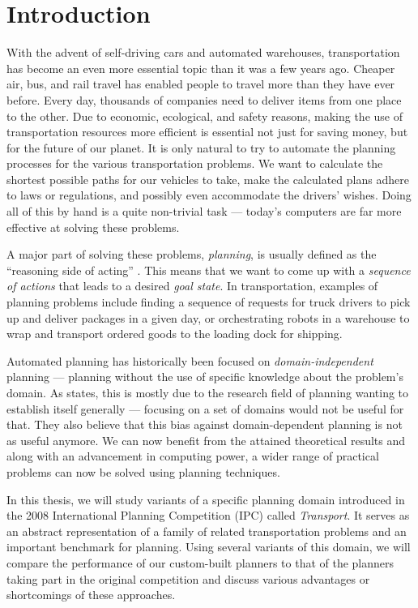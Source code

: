 \chapter*{Introduction}

With the advent of self-driving cars and automated warehouses, transportation has become an even more essential topic than it was a few years ago.
Cheaper air, bus, and rail travel has enabled people to travel more than they have ever before.
Every day, thousands of companies need to deliver items from
one place to the other. Due to economic, ecological, and safety reasons, making the use of transportation resources more efficient is essential not just for saving money,
but for the future of our planet.
It is only natural to try to automate the planning processes for the various transportation problems.
We want to calculate the shortest possible paths for our vehicles to take,
make the calculated plans adhere to laws or regulations, and possibly even accommodate the drivers'
wishes. Doing all of this by hand is a quite non-trivial task --- today's computers
are far more effective at solving these problems.

A major part of solving these problems, \textit{planning}, is usually defined as the ``reasoning side of acting'' \citep[Section~1.1]{Ghallab2004}.
This means that we want to come up with a \textit{sequence of actions} that leads to a desired \textit{goal state}.
In transportation, examples of planning problems include finding a sequence of 
requests for truck drivers to pick up and deliver packages in a given day,
or orchestrating robots in a warehouse to wrap and transport ordered goods to the loading dock for shipping.

Automated planning has historically been focused on \textit{domain-independent} planning --- planning without
the use of specific knowledge about the problem's domain.
As \citet{Nau2007} states, this is mostly due to the research field of planning wanting to
establish itself generally --- focusing on a set of domains would not be useful for that.
They also believe that this bias against domain-dependent planning is not as useful anymore.
We can now benefit from the attained theoretical results and along with an advancement in computing power,
a wider range of practical problems can now be solved using planning techniques.

In this thesis, we will study variants of a specific planning domain introduced in the 2008 International Planning Competition (IPC) called \textit{Transport}. It serves as an abstract representation of a family of related transportation problems
and an important benchmark for planning. Using several variants
of this domain, we will compare the performance of our custom-built planners to that of the planners taking part in the original competition and discuss various advantages or shortcomings of these approaches.

